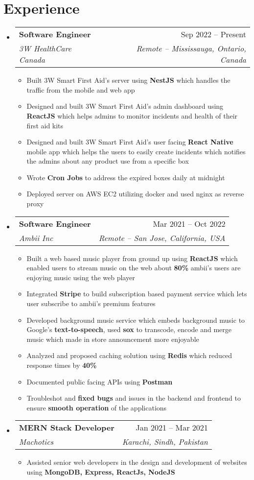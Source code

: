 \documentclass[a4paper,11pt]{article}
\makeatletter
\newcommand{\resumeItem}[1]{
  \item\small{#1}
}
\newcommand{\resumeItemListStart}{\begin{itemize}[rightmargin=0.11in]}
\newcommand{\resumeItemListEnd}{\end{itemize}}
\newcommand{\resumeQuadHeading}[4]{
  \item
  \begin{tabular*}{0.96\textwidth}[t]{l@{\extracolsep{\fill}}r}
    \textbf{#1} & #2 \\
    \textit{\small#3} & \textit{\small #4} \\
  \end{tabular*}
}
\newcommand{\resumeHeadingListStart}{
  \begin{itemize}[leftmargin=0.15in, label={}]
}
\newcommand{\resumeHeadingListEnd}{\end{itemize}}
\makeatother
\begin{document}

\section{Experience}
\resumeHeadingListStart{}
  \resumeQuadHeading{Software Engineer}{Sep 2022 -- Present}
  {3W HealthCare Canada}{Remote -- Mississauga, Ontario, Canada}
    \resumeItemListStart{}
      \resumeItem{ Built 3W Smart First Aid’s server using \textbf{NestJS} which handles the traffic from the mobile and web app}
      \resumeItem{Designed and built 3W Smart First Aid’s admin dashboard using \textbf{ReactJS} which helps
admins to monitor incidents and health of their first aid kits}
      \resumeItem{Designed and built 3W Smart First Aid’s user facing \textbf{React Native} mobile app which helps the users
to easily create incidents which notifies the admins about any product use from a specific box}
\resumeItem{Wrote \textbf{Cron Jobs} to address the expired boxes daily at midnight}
\resumeItem{Deployed server on AWS EC2 utilizing docker and used nginx as reverse proxy}
    \resumeItemListEnd{}

  \resumeQuadHeading{Software Engineer}{Mar 2021 -- Oct 2022}
  {Ambii Inc}{Remote -- San Jose, California, USA}
    \resumeItemListStart{}
      \resumeItem{Built a web based music player from ground up using \textbf{ReactJS} which enabled users to stream
music on the web about \textbf{80\%} ambii’s users are enjoying music using the web player}
    \resumeItem{Integrated \textbf{Stripe} to build subscription based payment service which lets user subscribe to ambii's premium features}
    \resumeItem{Developed background music service which embeds background music to Google's \textbf{text-to-speech}, used \textbf{sox} to transcode, encode and merge music which made in store announcement more enjoyable}
    \resumeItem{Analyzed and proposed caching solution using \textbf{Redis} which reduced response times by \textbf{40\%}}
    \resumeItem{Documented public facing APIs using \textbf{Postman}}
    \resumeItem{Troubleshot and \textbf{fixed bugs} and issues in the backend and frontend to ensure \textbf{smooth operation} of the applications}
    \resumeItemListEnd{}

  \resumeQuadHeading{MERN Stack Developer}{Jan 2021 -- Mar 2021}
  {Machotics}{Karachi, Sindh, Pakistan}
    \resumeItemListStart{}
      \resumeItem{Assisted senior web developers in the design and development of websites using \textbf{MongoDB, Express, ReactJs, NodeJS}}
    \resumeItemListEnd{}
\resumeHeadingListEnd{}
\end{document}
